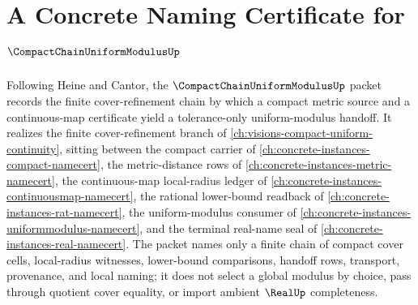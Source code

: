 \chapter{A Concrete Naming Certificate for $\CompactChainUniformModulusUp$}
\label{ch:concrete-instances-compact-chain-uniform-modulus-namecert}

Following Heine and Cantor, the $\CompactChainUniformModulusUp$ packet records the finite cover-refinement chain by which a compact metric source and a continuous-map certificate yield a tolerance-only uniform-modulus handoff. It realizes the finite cover-refinement branch of \autoref{ch:visions-compact-uniform-continuity}, sitting between the compact carrier of \autoref{ch:concrete-instances-compact-namecert}, the metric-distance rows of \autoref{ch:concrete-instances-metric-namecert}, the continuous-map local-radius ledger of \autoref{ch:concrete-instances-continuousmap-namecert}, the rational lower-bound readback of \autoref{ch:concrete-instances-rat-namecert}, the uniform-modulus consumer of \autoref{ch:concrete-instances-uniformmodulus-namecert}, and the terminal real-name seal of \autoref{ch:concrete-instances-real-namecert}. The packet names only a finite chain of compact cover cells, local-radius witnesses, lower-bound comparisons, handoff rows, transport, provenance, and local naming; it does not select a global modulus by choice, pass through quotient cover equality, or import ambient $\RealUp$ completeness.

